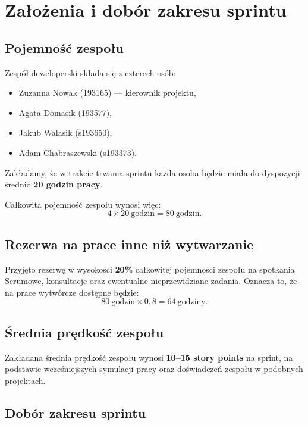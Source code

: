 \documentclass[12pt,a4paper,colorlinks=true,linkcolor=NavyBlue,citecolor=red,urlcolor=NavyBlue]{book}
\begin{document}
\chapter{Założenia i dobór zakresu sprintu}

\section{Pojemność zespołu}

Zespół deweloperski składa się z czterech osób:
\begin{itemize}[topsep=0pt, itemsep=0.3em]
    \item Zuzanna Nowak (193165) — kierownik projektu,
    \item Agata Domasik (193577),
    \item Jakub Walasik (s193650),
    \item Adam Chabraszewski (s193373).
\end{itemize}

\vspace{1em}
Zakładamy, że w trakcie trwania sprintu każda osoba będzie miała do dyspozycji średnio \textbf{20 godzin pracy}.

\vspace{1em}
Całkowita pojemność zespołu wynosi więc:
\[
4 \times 20\ \text{godzin} = 80\ \text{godzin}.
\]

\section{Rezerwa na prace inne niż wytwarzanie}

Przyjęto rezerwę w wysokości \textbf{20\%} całkowitej pojemności zespołu na spotkania Scrumowe, konsultacje oraz ewentualne nieprzewidziane zadania.  
Oznacza to, że na prace wytwórcze dostępne będzie:
\[
80\ \text{godzin} \times 0{,}8 = 64\ \text{godziny}.
\]

\section{Średnia prędkość zespołu}

Zakładana średnia prędkość zespołu wynosi \textbf{10–15 story points} na sprint, na podstawie wcześniejszych symulacji pracy oraz doświadczeń zespołu w podobnych projektach.

\section{Dobór zakresu sprintu}
\end{document}
